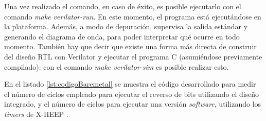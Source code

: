 Una vez realizado el comando, en caso de éxito, es posible ejecutarlo con el comando \emph{make verilator-run}. En este momento, el programa está ejecutándose en la plataforma. Además, a modo de depuración, supervisa la salida estándar y generando el diagrama de onda, para poder interpretar qué ocurre en todo momento. También hay que decir que existe una forma más directa de construir del diseño RTL con Verilator y ejecutar el programa C (asumiéndose previamente compilado): con el comando \emph{make verilator-sim} es posible realizar esto. 

En el listado \ref{lst:codigoBaremetal} se muestra el código desarrollado para medir el número de ciclos empleado para ejecutar el reverso de bits utilizando el diseño integrado, y el número de ciclos para ejecutar una versión \textit{software}, utilizando los \textit{timers} de X-HEEP \cite{timer-sdk}. 

